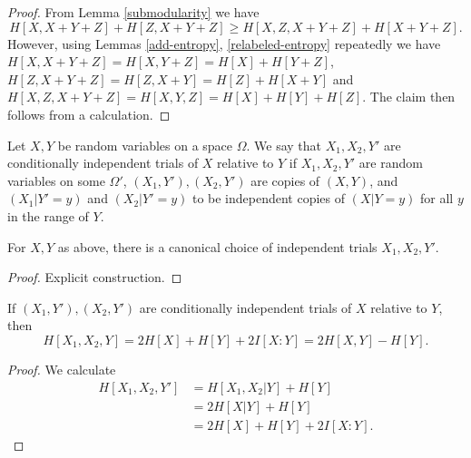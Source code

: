 \begin{proof}
From Lemma \ref{submodularity} we have
$$ H[X, X+Y+Z] + H[Z, X+Y+Z] \geq H[X, Z, X+Y+Z] + H[X+Y+Z].$$
However, using Lemmas \ref{add-entropy}, \ref{relabeled-entropy} repeatedly we have $H[X, X+Y+Z] = H[X, Y+Z] = H[X] + H[Y+Z]$, $H[Z, X+Y + Z] = H[Z, X+Y] = H[Z] + H[X+Y]$ and $H[X, Z, X+Y+Z] = H[X, Y, Z] = H[X] + H[Y] + H[Z]$.  The claim then follows from a calculation.
\end{proof}

\begin{definition}\label{cond-trial}  Let $X,Y$ be random variables on a space $\Omega$.
  We say that $X_1, X_2, Y'$ are conditionally independent trials of $X$ relative to $Y$ if $X_1,X_2,Y'$ are random variables on some $\Omega'$, $(X_1,Y'), (X_2,Y')$ are copies of $(X,Y)$, and $(X_1 | Y' = y)$ and $(X_2 | Y' = y)$ to be independent copies of $(X | Y = y)$ for all $y$ in the range of $Y$.
\end{definition}

\begin{lemma}\label{cond-indep-exist} For $X,Y$ as above, there is a canonical choice of independent trials $X_1,X_2,Y'$.
\end{lemma}

\begin{proof} Explicit construction.
\end{proof}

\begin{lemma}\label{cond-trial-ent}  If $(X_1,Y'), (X_2,Y')$ are conditionally
independent trials of $X$ relative to $Y$, then
$$ H[X_1,X_2,Y] = 2 H[X] + H[Y] + 2 I[X:Y] = 2 H[X,Y] - H[Y].$$
\end{lemma}

\begin{proof}  We calculate
  \begin{equation}
  \begin{split} H[X_1, X_2, Y'] &= H[X_1,X_2|Y] + H[Y] \\
    &= 2 H[X|Y] + H[Y] \\
    &= 2 H[X] + H[Y] + 2 I[X:Y].
  \end{split}  \end{equation}
\end{proof}


